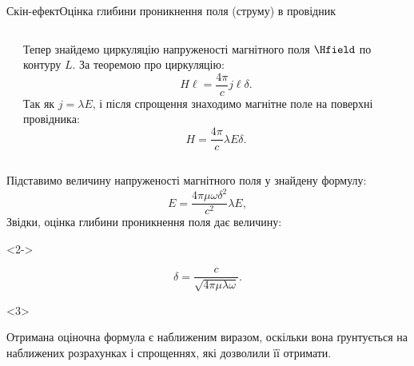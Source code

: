 \documentclass[onlytextwidth]{beamer}
\begin{document}
\begin{frame}{Скін-ефект}{Оцінка глибини проникнення поля (струму) в провідник}
\begin{onlyenv}
\begin{columns}
\begin{column}{0.4\linewidth}
		\end{column}
		\begin{column}{0.6\linewidth}
			\begin{block}{}\justifying
				Тепер знайдемо циркуляцію напруженості
				магнітного поля \textcolor{blue}{$\Hfield$} по контуру \textcolor{green!60!black}{$L$}. За
				теоремою про циркуляцію:
				\begin{equation*}
					H \ell = \frac{4\pi}{c} j \ell \delta.
				\end{equation*}
				Так як $j = \lambda E$, і після спрощення знаходимо магнітне поле на поверхні провідника:
				\begin{equation*}
					H = \frac{4\pi}{c} \lambda E \delta.
				\end{equation*}
			\end{block}
		\end{column}
	\end{columns}
	\begin{block}{}\justifying
		Підставимо величину напруженості магнітного поля у знайдену формулу:
		\begin{equation*}
			E =  \frac{4\pi\mu\omega \delta^2}{c^2} \lambda E,
		\end{equation*}
		Звідки, оцінка глибини проникнення поля дає величину:
	\end{block}
\end{onlyenv}
\begin{onlyenv}<2->
	\begin{block}{}\justifying
		\begin{equation*}
			\delta = \frac{c}{\sqrt{4\pi\mu\lambda\omega}}.
		\end{equation*}
	\end{block}
\end{onlyenv}
\begin{onlyenv}<3>
\begin{alertblock}{}\justifying\scriptsize
Отримана оціночна формула є наближеним виразом, оскільки вона ґрунтується на наближених розрахунках і спрощеннях, які
дозволили її отримати.

\bigskip


\end{alertblock}
\end{onlyenv}
\end{frame}
\end{document}
